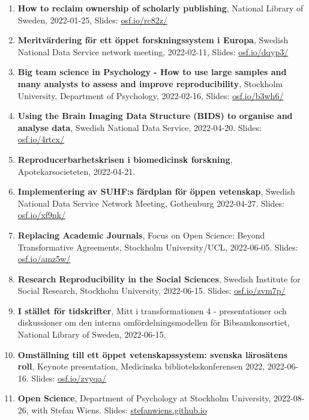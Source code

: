 \documentclass[10pt]{article}
\begin{document}
\begin{enumerate}[nolistsep]
Slides: \href{https://osf.io/7xenk/}{osf.io/7xenk/}
\item \textbf{How to reclaim ownership of scholarly publishing}, National Library of Sweden, 2022-01-25,
Slides: \href{https://osf.io/rc82z/}{osf.io/rc82z/}
\item \textbf{Meritvärdering för ett öppet forskningssystem i Europa}, Swedish National Data Service network meeting, 2022-02-11,
Slides: \href{https://osf.io/dqyp3/}{osf.io/dqyp3/}
\item \textbf{Big team science in Psychology - How to use large samples and many analysts to assess and improve reproducibility}, Stockholm University, Department of Psychology, 2022-02-16,
Slides: \href{https://osf.io/b3wh6/}{osf.io/b3wh6/}
\item \textbf{Using the Brain Imaging Data Structure (BIDS) to organise and analyse data}, Swedish National Data Service, 2022-04-20. Slides: \href{https://osf.io/4rtcx/}{osf.io/4rtcx/}
\item \textbf{Reproducerbarhetskrisen i biomedicinsk forskning}, Apotekarsocieteten, 2022-04-21.
\item \textbf{Implementering av SUHF:s färdplan för öppen vetenskap}, Swedish National Data Service Network Meeting, Gothenburg 2022-04-27. Slides: \href{https://osf.io/xf9nk/}{osf.io/xf9nk/}
\item \textbf{Replacing Academic Journals}, Focus on Open Science: Beyond Transformative Agreements, Stockholm University/UCL, 2022-06-05. Slides: \href{https://osf.io/amz5w/}{osf.io/amz5w/}
\item \textbf{Research Reproducibility in the Social Sciences}, Swedish Institute for Social Research, Stockholm University, 2022-06-15. Slides: \href{https://osf.io/zvm7p/}{osf.io/zvm7p/}
\item \textbf{I stället för tidskrifter}, Mitt i transformationen 4 - presentationer och diskussioner om den interna omfördelningsmodellen för Bibsamkonsortiet, National Library of Sweden, 2022-06-15.
\item \textbf{Omställning till ett öppet vetenskapssystem: svenska lärosätens roll}, Keynote presentation, Medicinska bibliotekskonferensen 2022, 2022-06-16. Slides: \href{https://osf.io/zvyqa/}{osf.io/zvyqa/}
\item \textbf{Open Science}, Department of Psychology at Stockholm University, 2022-08-26, with Stefan Wiens. Slides: \href{https://stefanwiens.github.io/open_science_talk/openscience.html}{stefanwiens.github.io}

\end{enumerate}
\end{document}
